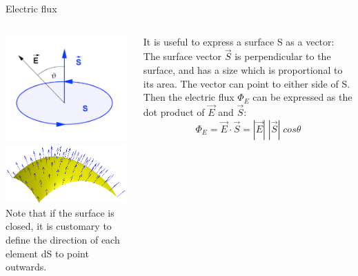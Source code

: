 %
%
%

\begin{frame}{Electric flux}

\begin{columns}
  \begin{column}{0.33\textwidth}
   \begin{center}
    \includegraphics[width=0.98\textwidth]{./images/schematics/electric_flux_surface.png}\\
    \includegraphics[width=0.98\textwidth]{./images/schematics/surface_normal.png}\\
    {\scriptsize
     Note that if the surface is closed, it is customary
     to define the direction of each element dS to point outwards.\\
   }
   \end{center}
  \end{column}
  \begin{column}{0.67\textwidth}
  {\small
    It is useful to express a surface S as a vector:
    The surface vector $\vec{S}$ is perpendicular to the surface, and has a size which is proportional to its area.
    The vector can point to either side of S. \\
    Then the electric flux $\Phi_E$ can be expressed as the dot product of $\vec{E}$ and $\vec{S}$:
    \begin{equation*}
       \Phi_{E} = \vec{E} \cdot \vec{S} =  |\vec{E}| \; |\vec{S}| \; cos\theta
    \end{equation*}

}
\end{column}
\end{columns}
\end{frame}
